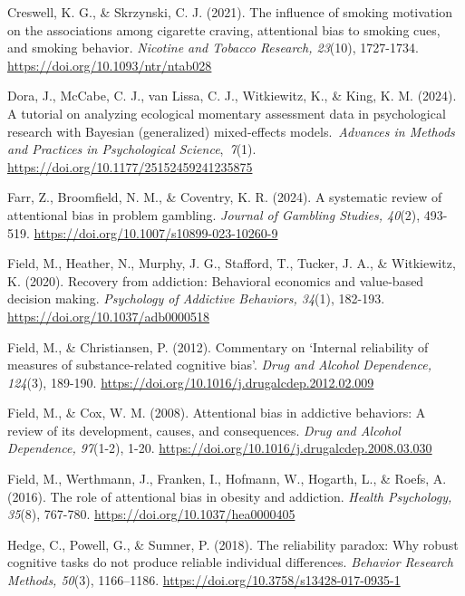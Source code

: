 \documentclass[authordate, empirical]{jote-new-article}
\begin{document}
	Creswell, K. G., \& Skrzynski, C. J. (2021). The influence of smoking motivation on the associations among cigarette craving, attentional bias to smoking cues, and smoking behavior. \emph{Nicotine and Tobacco Research, 23}(10), 1727-1734. \url{https://doi.org/10.1093/ntr/ntab028}



	Dora, J., McCabe, C. J., van Lissa, C. J., Witkiewitz, K., \& King, K. M. (2024). A tutorial on analyzing ecological momentary assessment data in psychological research with Bayesian (generalized) mixed-effects models. \emph{Advances in Methods and Practices in Psychological Science}, \emph{7}(1). \url{https://doi.org/10.1177/25152459241235875}



	Farr, Z., Broomfield, N. M., \& Coventry, K. R. (2024). A systematic review of attentional bias in problem gambling. \emph{Journal of Gambling Studies, 40}(2), 493-519. \url{https://doi.org/10.1007/s10899-023-10260-9}



	Field, M., Heather, N., Murphy, J. G., Stafford, T., Tucker, J. A., \& Witkiewitz, K. (2020). Recovery from addiction: Behavioral economics and value-based decision making. \emph{Psychology of Addictive Behaviors, 34}(1), 182-193. \url{https://doi.org/10.1037/adb0000518}



	Field, M., \& Christiansen, P. (2012). Commentary on ‘Internal reliability of measures of substance-related cognitive bias'. \emph{Drug and Alcohol Dependence, 124}(3), 189-190. \url{https://doi.org/10.1016/j.drugalcdep.2012.02.009}



	Field, M., \& Cox, W. M. (2008). Attentional bias in addictive behaviors: A review of its development, causes, and consequences. \emph{Drug and Alcohol Dependence, 97}(1-2), 1-20. \url{https://doi.org/10.1016/j.drugalcdep.2008.03.030}



	Field, M., Werthmann, J., Franken, I., Hofmann, W., Hogarth, L., \& Roefs, A. (2016). The role of attentional bias in obesity and addiction. \emph{Health Psychology, 35}(8), 767-780. \url{https://doi.org/10.1037/hea0000405}



	Hedge, C., Powell, G., \& Sumner, P. (2018). The reliability paradox: Why robust cognitive tasks do not produce reliable individual differences. \emph{Behavior Research Methods, 50}(3), 1166--1186. \url{https://doi.org/10.3758/s13428-017-0935-1}
\end{document}
